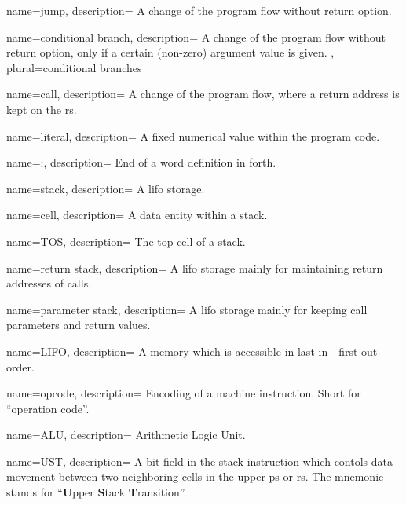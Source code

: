  {
    name={jump},
    description={
      A change of the program flow without return option.
      \nopostdesc
    }
}

 {
    name={conditional branch},
    description={
      A change of the program flow without return option, only if a certain (non-zero)
      argument value is given.
      \nopostdesc
    },
    plural={conditional branches}
}

 {
    name={call},
    description={
      A change of the program flow, where a return address is kept
      on the \gls{rs}.
      \nopostdesc
    }
}

 {
    name={literal},
    description={
      A fixed numerical value within the program code.
      \nopostdesc
    }
}

 {
    name={;},
    description={
      End of a \gls{word} definition in \Gls{forth}.
      \nopostdesc
    }
}

 {
    name={stack},
    description={
      A \gls{lifo} storage.
      \nopostdesc
    }
}

 {
    name={cell},
    description={
      A data entity within a \gls{stack}.
      \nopostdesc
    }
}

 {
    name={TOS},
    description={
      The top \gls{cell} of a \gls{stack}.
      \nopostdesc
    }
}

 {
    name={return stack},
    description={
      A \gls{lifo} storage mainly for maintaining return addresses
      of \glspl{call}.
      \nopostdesc
    }
}

 {
    name={parameter stack},
    description={
      A \gls{lifo} storage mainly for keeping call parameters and
      return values.
      \nopostdesc
    }
}

 {
    name={LIFO},
    description={
      A memory which is accessible in last in - first out order.
      \nopostdesc
    }
}

 {
    name={opcode},
    description={
      Encoding of a machine instruction. Short for ``operation code''.
      \nopostdesc
    }
}

 {
    name={ALU},
    description={
      Arithmetic Logic Unit.
      \nopostdesc
    }
}

 {
    name={UST},
    description={
      A bit field in the stack instruction which contols data movement
      between two neighboring \glspl{cell} in the upper \gls{ps} or \gls{rs}.
      The mnemonic stands for ``\textbf{U}pper \textbf{S}tack \textbf{T}ransition''.
      \nopostdesc
    }
}


